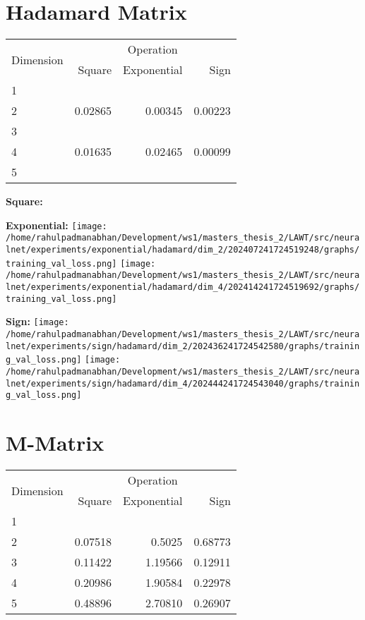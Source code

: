\documentclass{article}
\begin{document}
\pagebreak
\section{Hadamard Matrix}
\begin{tabular}{@{}lrrr@{}}
\toprule
\multirow{2}{*}{Dimension} & \multicolumn{3}{c}{Operation} \\
\cmidrule(l){2-4}
& Square & Exponential & Sign \\
\midrule
1 & & & \\
2 & 0.02865 & 0.00345 & 0.00223 \\
3 & & & \\
4 & 0.01635 & 0.02465 & 0.00099 \\
5 & & & \\
\bottomrule
\end{tabular}

\textbf{Square:}

\textbf{Exponential:}
\texttt{[image: /home/rahulpadmanabhan/Development/ws1/masters\_thesis\_2/LAWT/src/neuralnet/experiments/exponential/hadamard/dim\_2/202407241724519248/graphs/training\_val\_loss.png]}
\texttt{[image: /home/rahulpadmanabhan/Development/ws1/masters\_thesis\_2/LAWT/src/neuralnet/experiments/exponential/hadamard/dim\_4/202414241724519692/graphs/training\_val\_loss.png]}

\textbf{Sign:}
\texttt{[image: /home/rahulpadmanabhan/Development/ws1/masters\_thesis\_2/LAWT/src/neuralnet/experiments/sign/hadamard/dim\_2/202436241724542580/graphs/training\_val\_loss.png]}
\texttt{[image: /home/rahulpadmanabhan/Development/ws1/masters\_thesis\_2/LAWT/src/neuralnet/experiments/sign/hadamard/dim\_4/202444241724543040/graphs/training\_val\_loss.png]}

\pagebreak
\section{M-Matrix}
\begin{tabular}{@{}lrrr@{}}
\toprule
\multirow{2}{*}{Dimension} & \multicolumn{3}{c}{Operation} \\
\cmidrule(l){2-4}
& Square & Exponential & Sign \\
\midrule
1 & & & \\
2 & 0.07518 & 0.5025 & 0.68773 \\
3 & 0.11422 & 1.19566 & 0.12911 \\
4 & 0.20986 & 1.90584 & 0.22978 \\
5 & 0.48896 & 2.70810 & 0.26907 \\
\bottomrule
\end{tabular}
\\
\end{document}
